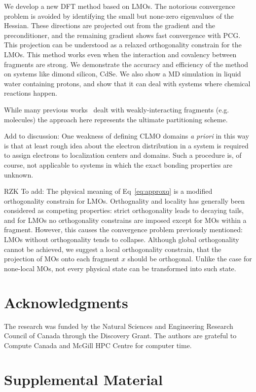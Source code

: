 \documentclass[aps,prl,twocolumn,reprint,amsmath,amssymb]{revtex4-1}
\begin{document}
\label{marker:conclusion} We develop a new DFT method based on LMOs. The notorious convergence problem is avoided by identifying the small but none-zero eigenvalues of the Hessian. These directions are projected out from the gradient and the preconditioner, and the remaining gradient shows fast convergence with PCG. This projection can be understood as a relaxed orthogonality constrain for the LMOs. This method works even when the interaction and covalency between fragments are strong. We demonstrate the accuracy and efficiency of the method on systems like dimond silicon, CdSe. We also show a MD simulation in liquid water containing protons, and show that it can deal with systems where chemical reactions happen.

While many previous works~\cite{ZZZ} dealt with weakly-interacting fragments (e.g. molecules) the approach here represents the ultimate partitioning scheme.

Add to discussion: One weakness of defining CLMO domains \emph{a priori} in this way is that at least rough idea about the electron distribution in a system is required to assign electrons to localization centers and domains. Such a procedure is, of course, not applicable to systems in which the exact bonding properties are unknown.

RZK To add: The physical meaning of Eq~\ref{eq:approxq} is a modified orthogonality constrain for LMOs. Orthognality and locality has generally been considered as competing properties: strict orthogonality leads to decaying tails, and for LMOs no orthogonality constrains are imposed except for MOs within a fragment. However, this causes the convergence problem previously mentioned: LMOs without orthogonality tends to collapse. Although global orthogonality cannot be achieved, we suggest a local orthogonality constrain, that the projection of MOs onto each fragment $x$ should be orthogonal. Unlike the case for none-local MOs, not every physical state can be transformed into such state.

\section{Acknowledgments} The research was funded by the Natural Sciences and Engineering Research Council of Canada through the Discovery Grant. The authors are grateful to Compute Canada and McGill HPC Centre for computer time.



\section{Supplemental Material}
\end{document}
